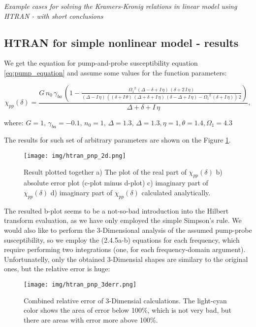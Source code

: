 \documentclass[12pt,twoside,a4paper]{article}
\numberwithin{equation}{subsection}
\numberwithin{figure}{subsection}
\begin{document}
\footnotesize{\textit{Example cases for solving the Kramers-Kronig relations in linear model using HTRAN - with short conclusions}}

\subsection{HTRAN for simple nonlinear model - results} \label{chap:htran_nlo}

We get the equation for pump-and-probe susceptibility equation \ref{eq:pump_equation} and assume some values for the function
parameters:

\begin{equation} \label{eq:htran_fparameters}
  {\chi_{pp}}(\delta )=\frac {G\,{n_{0}}\,{\gamma_{ba}}\, \left( \! 1 - \frac {{\Omega_{1}}^{2}\,(\Delta - \delta  + I\,\eta
  )\,(\delta  + 2\,I\,\eta )}{(\Delta  - I\,\eta )\,((\delta  + I\,\theta )\,(\Delta  + \delta  + I\,\eta )\,(\delta - \Delta  +
  I\,\eta ) - {\Omega_{1}}^{2}\,(\delta  + I\,\eta ))\,2} \!  \right) }{\Delta  + \delta  + I\,\eta },
\end{equation}

where: $G = 1,\,{\gamma_{ba}} = -0.1,\, {n_{0}} = 1,\,\Delta = 1.3,\,\Delta = 1.3,\eta = 1, \theta = 1.4, \Omega_{1} = 4.3$

The results for such set of arbitrary parameters are shown on the Figure \ref{fig:htran_pnp_2d}.

\begin{figure}
  \texttt{[image: img/htran\_pnp\_2d.png]}
  \caption{Result plotted together 
    a) The plot of the real part of $\chi_{pp} (\delta )$ 
    b) absolute error plot (c-plot minus d-plot) 
    c) imaginary part of $\chi_{pp} (\delta )$
    d) imaginary part of ${\chi_{pp}}(\delta )$ calculated analytically.
    \label{fig:htran_pnp_2d}}
\end{figure}

The resulted b-plot seems to be a not-so-bad introduction into the Hilbert transform evaluation, as we have only employed the
simple Simpson's rule. We would also like to perform the 3-Dimensional analysis of the assumed pump-probe susceptibility, so we
employ the (2.4.5a-b) equations for each frequency, which require performing two integrations (one, for each frequency-domain
argument). Unfortunatelly, only the obtained 3-Dimensial shapes are similary to the original ones, but the relative error is huge:

\begin{figure}
  \texttt{[image: img/htran\_pnp\_3derr.png]}
  \caption{Combined relative error of 3-Dimensial calculations. The light-cyan color shows the area of error below 100\%, which is
  not very bad, but there are areas with error more above 100\%. \label{fig:htran_pnp_3derr}}
\end{figure}
\end{document}
